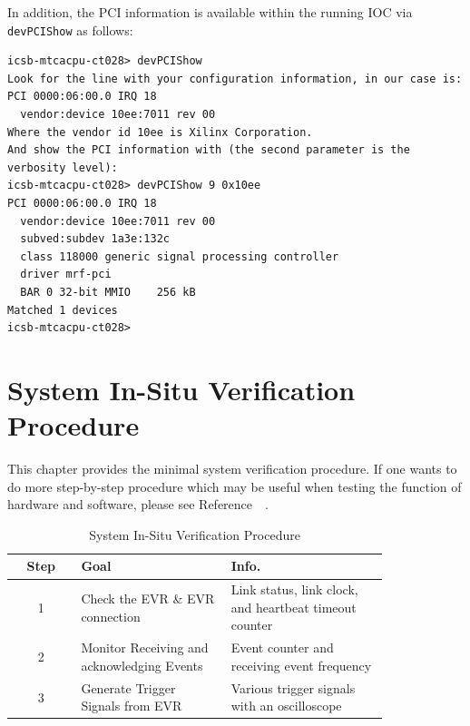 \documentclass[11pt
  , a4paper
  , article
  , oneside
  , showtrims
]{memoir}
\begin{document}
In addition, the PCI information is available within the running IOC via \texttt{devPCIShow} as follows:
\begin{lstlisting}
icsb-mtcacpu-ct028> devPCIShow
Look for the line with your configuration information, in our case is:
PCI 0000:06:00.0 IRQ 18
  vendor:device 10ee:7011 rev 00
Where the vendor id 10ee is Xilinx Corporation.
And show the PCI information with (the second parameter is the verbosity level):
icsb-mtcacpu-ct028> devPCIShow 9 0x10ee
PCI 0000:06:00.0 IRQ 18
  vendor:device 10ee:7011 rev 00
  subved:subdev 1a3e:132c
  class 118000 generic signal processing controller
  driver mrf-pci
  BAR 0 32-bit MMIO    256 kB
Matched 1 devices
icsb-mtcacpu-ct028>
\end{lstlisting}

\newpage
\chapter{System In-Situ Verification Procedure}
This chapter provides the minimal system verification procedure. If one wants to do more step-by-step procedure which may be useful when testing the function of hardware and software, please see Reference~~\citep[see][p14]{EVR-USER-GUIDE}.

\begin{table}[!htb]
  \centering
  \begin{tabular}{c|p{0.4\linewidth}|p{0.42\linewidth}}
    \toprule
    Step & Goal                                       & Info.                                                  \\\midrule
    1    & Check the EVR \& EVR connection            & Link status, link clock, and heartbeat timeout counter \\\midrule
    2    & Monitor Receiving and acknowledging Events & Event counter and receiving event frequency            \\\midrule
    3    & Generate Trigger Signals from EVR          & Various trigger signals with an oscilloscope           \\\bottomrule
  \end{tabular}
  \caption[]{System In-Situ Verification Procedure}
  \label{table:checklist}
\end{table}
\end{document}

